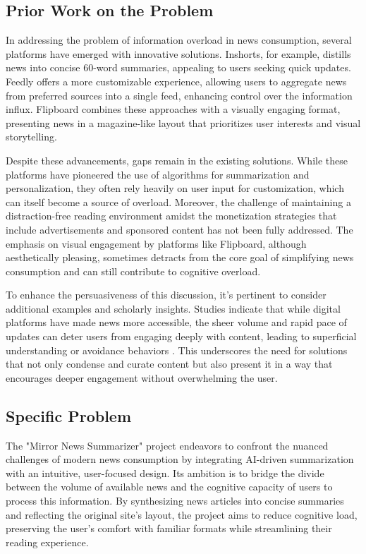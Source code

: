 \documentclass[10pt]{article}
\begin{document}
\subsection{Prior Work on the Problem}
In addressing the problem of information overload in news consumption, several platforms have emerged with innovative solutions. Inshorts\cite{inshorts2018}, for example, distills news into concise 60-word summaries, appealing to users seeking quick updates. Feedly\cite{feedlyFeatures} offers a more customizable experience, allowing users to aggregate news from preferred sources into a single feed, enhancing control over the information influx. Flipboard\cite{flipboardMagazine} combines these approaches with a visually engaging format, presenting news in a magazine-like layout that prioritizes user interests and visual storytelling.

Despite these advancements, gaps remain in the existing solutions. While these platforms have pioneered the use of algorithms for summarization and personalization, they often rely heavily on user input for customization, which can itself become a source of overload. Moreover, the challenge of maintaining a distraction-free reading environment amidst the monetization strategies that include advertisements and sponsored content has not been fully addressed. The emphasis on visual engagement by platforms like Flipboard\cite{flipboardMagazine}, although aesthetically pleasing, sometimes detracts from the core goal of simplifying news consumption and can still contribute to cognitive overload.

To enhance the persuasiveness of this discussion, it's pertinent to consider additional examples and scholarly insights. Studies indicate that while digital platforms have made news more accessible, the sheer volume and rapid pace of updates can deter users from engaging deeply with content, leading to superficial understanding or avoidance behaviors  \cite{frontiersinpsych2022} . This underscores the need for solutions that not only condense and curate content but also present it in a way that encourages deeper engagement without overwhelming the user.

\subsection{Specific Problem}
The "Mirror News Summarizer" project endeavors to confront the nuanced challenges of modern news consumption by integrating AI-driven summarization with an intuitive, user-focused design. Its ambition is to bridge the divide between the volume of available news and the cognitive capacity of users to process this information. By synthesizing news articles into concise summaries and reflecting the original site's layout, the project aims to reduce cognitive load, preserving the user's comfort with familiar formats while streamlining their reading experience.
\end{document}
